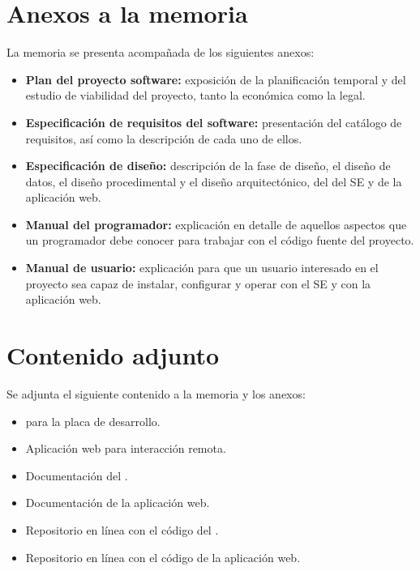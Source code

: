 \section{Anexos a la memoria}\label{sec:anexos}
La memoria se presenta acompañada de los siguientes anexos:

\begin{itemize}
\item
  \textbf{Plan del proyecto software:} exposición de la
  planificación temporal y del estudio de viabilidad del proyecto, tanto la
  económica como la legal.
\item
  \textbf{Especificación de requisitos del software:}
  presentación del catálogo de requisitos, así como la descripción de cada uno
  de ellos.
\item
  \textbf{Especificación de diseño:} descripción de la fase de diseño, el
  diseño de datos, el diseño procedimental y el diseño arquitectónico, del
   del SE y de la aplicación web.
\item
  \textbf{Manual del programador:} explicación en detalle de aquellos aspectos
  que un programador debe conocer para trabajar con el código fuente del
  proyecto.
\item
  \textbf{Manual de usuario:} explicación para que un usuario interesado en el
  proyecto sea capaz de instalar, configurar y operar con el SE y con la
  aplicación web.
\end{itemize}

\clearpage

\section{Contenido adjunto}\label{sec:adjunto}
Se adjunta el siguiente contenido a la memoria y los anexos:

\begin{itemize}
\item
   para la placa de desarrollo.
\item
  Aplicación web para interacción remota.
\item	
  Documentación del .
\item	
  Documentación de la aplicación web.
\item
  Repositorio en línea con el código del .
\item
  Repositorio en línea con el código de la aplicación web.
\end{itemize}
